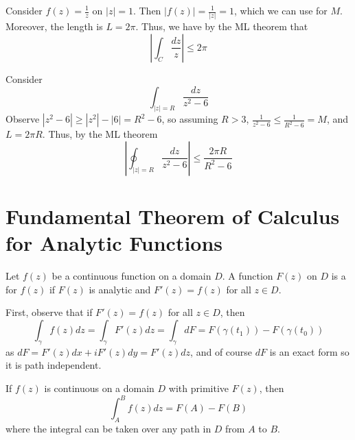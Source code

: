 \begin{example}
    Consider $f(z) = \frac{1}{z}$ on $|z| = 1$. Then $|f(z)| = \frac{1}{|z|} = 1$, which we can use for $M$. Moreover, the length is $L = 2\pi$. Thus, we have by the ML theorem that \begin{equation*}
        \left|\int_C \frac{dz}{z}\right| \leq 2\pi
    \end{equation*}
\end{example}


\begin{example}
    Consider \begin{equation*}
        \int_{|z| = R}\frac{dz}{z^2-6}
    \end{equation*}
    Observe $|z^2 - 6| \geq |z^2| - |6| = R^2-6$, so assuming $R > 3$, $\frac{1}{z^2-6} \leq \frac{1}{R^2-6} = M$, and $L = 2\pi R$. Thus, by the ML theorem \begin{equation*}
        \left|\oint_{|z| = R}\frac{dz}{z^2-6}\right| \leq \frac{2\pi R}{R^2-6}
    \end{equation*}
\end{example}



\section{Fundamental Theorem of Calculus for Analytic Functions}

\begin{definition}
    Let $f(z)$ be a continuous function on a domain $D$. A function $F(z)$ on $D$ is a  for $f(z)$ if $F(z)$ is analytic and $F'(z) = f(z)$ for all $z \in D$.
\end{definition}

First, observe that if $F'(z) = f(z)$ for all $z \in D$, then \begin{equation*}
    \int_{\gamma}f(z)dz = \int_{\gamma}F'(z)dz = \int_{\gamma}dF = F(\gamma(t_1)) - F(\gamma(t_0))
\end{equation*}
as $dF = F'(z)dx+iF'(z)dy = F'(z)dz$, and of course $dF$ is an exact form so it is path independent. 

\begin{theorem}
    If $f(z)$ is continuous on a domain $D$ with primitive $F(z)$, then \begin{equation*}
        \int_A^Bf(z)dz = F(A) - F(B)
    \end{equation*}
    where the integral can be taken over any path in $D$ from $A$ to $B$.
\end{theorem}


